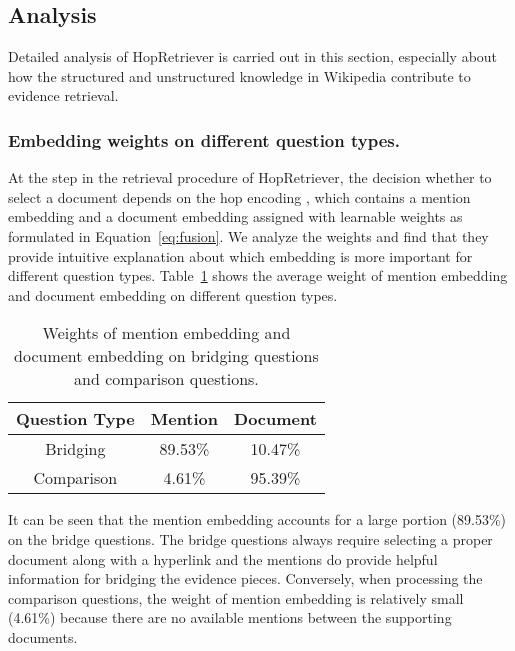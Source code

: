 \documentclass[letterpaper]{article} \usepackage{aaai21}  \usepackage{times}  \usepackage{helvet} \usepackage{courier}  \usepackage[hyphens]{url}  \usepackage{graphicx} \urlstyle{rm} \def\UrlFont{\rm}  \usepackage{graphicx}  \usepackage{natbib}  \usepackage{caption} \frenchspacing  \setlength{\pdfpagewidth}{8.5in}  \setlength{\pdfpageheight}{11in}
\begin{document}
\subsection{Analysis}
Detailed analysis of HopRetriever is carried out in this section, especially about how the structured and unstructured knowledge in Wikipedia contribute to evidence retrieval.


\subsubsection{Embedding weights on different question types.}
At the  step in the retrieval procedure of HopRetriever, the decision whether to select a document  depends on the hop encoding , which contains a mention embedding and a document embedding assigned with learnable weights as formulated in Equation~\eqref{eq:fusion}. We analyze the weights and find that they provide intuitive explanation about which embedding is more important for different question types. Table~\ref{tab:hop_weights} shows the average weight of mention embedding and document embedding on different question types. 


\begin{table}[htbp]
    \centering
    \footnotesize
    \begin{tabular}{c|c|c}
        \hline
        \textbf{Question Type}        & \textbf{Mention}    & \textbf{Document}  \\ \hline
        Bridging                      & 89.53\%             & 10.47\%            \\
        Comparison                    & 4.61\%              & 95.39\%            \\
        \hline
    \end{tabular}
    \caption{Weights of mention embedding and document embedding on bridging questions and comparison questions.} 
    \label{tab:hop_weights}
\end{table}

It can be seen that the mention embedding accounts for a large portion (89.53\%) on the bridge questions. The bridge questions always require selecting a proper document along with a hyperlink and the mentions do provide helpful information for bridging the evidence pieces. Conversely, when processing the comparison questions, the weight of mention embedding is relatively small (4.61\%) because there are no available mentions between the supporting documents. 
\end{document}
